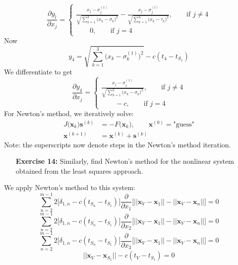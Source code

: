\documentclass[11pt]{article}
\theoremstyle{definition}
\newcommand{\1}[1]{\mathbf{1} \left \{ #1 \right \}}
\begin{document}
\begin{equation*}
    \frac{\partial y_l}{\partial x_j} = \begin{cases}
    \frac{x_j - \sigma_j^{(1)}}{\sqrt{\sum_{k=1}^3 \big(x_k - \sigma_k\big)^2}} - \frac{x_j - \sigma_j^{(l)}}{\sqrt{\sum_{k=1}^3 \big(x_k - \tau_k\big)^2}}, \qquad \text{if } j \neq 4 \\
    \qquad 0, \qquad \text{if } j = 4
    \end{cases}
\end{equation*}
Now
\begin{equation*}
    y_4 = \sqrt{\sum_{k=1}^3 \big(x_k - \sigma_k^{(1)}\big)^2} -  c(t_4 - t_{S_1})
\end{equation*}
We differentiate to get
\begin{equation*}
    \frac{\partial y_4}{\partial x_j} = \begin{cases}
    \frac{x_j - \sigma_j^{(1)}}{\sqrt{\sum_{k=1}^3 \big(x_k - \sigma_k\big)^2}}, \qquad \text{if } j \neq 4 \\
    \qquad -c, \qquad \text{if } j = 4
    \end{cases}
\end{equation*}
For Newton's method, we iteratively solve:
\begin{align*}
    J\big(\textbf{x}_k\big)\textbf{s}^{(k)} &= -F\big(\textbf{x}_k\big), \qquad \textbf{x}^{(0)} = \text{"guess"} \\
    \textbf{x}^{(k+1)} &= \textbf{x}^{(k)} + \textbf{s}^{(k)}
\end{align*}
Note: the superscripts now denote steps in the Newton's method iteration.

\begin{itemize}
\item[{\textbf{Exercise 14:}}] Similarly, find Newton's method for the nonlinear system obtained from the least squares approach.
\end{itemize}
We apply Newton's method to this system:
\begin{equation*}
    \sum_{n=2}^{m-1} 2\big[\delta_{1,n} - c(t_{S_n} - t_{S_1})\big] \frac{\partial}{\partial x_1} \big[||\textbf{x}_V - \textbf{x}_1|| - ||\textbf{x}_V - \textbf{x}_n||\big] = 0
\end{equation*}
\begin{equation*}
    \sum_{n=2}^{m-1} 2\big[\delta_{1,n} - c(t_{S_n} - t_{S_1})\big] \frac{\partial}{\partial x_2} \big[||\textbf{x}_V - \textbf{x}_1|| - ||\textbf{x}_V - \textbf{x}_n||\big] = 0
\end{equation*}
\begin{equation*}
    \sum_{n=2}^{m-1} 2\big[\delta_{1,n} - c(t_{S_n} - t_{S_1})\big] \frac{\partial}{\partial x_3} \big[||\textbf{x}_V - \textbf{x}_1|| - ||\textbf{x}_V - \textbf{x}_n||\big] = 0
\end{equation*}
\begin{equation*}
    ||\textbf{x}_V - \textbf{x}_{S_1}|| - c(t_V - t_{S_1}) = 0
\end{equation*}
\end{document}
